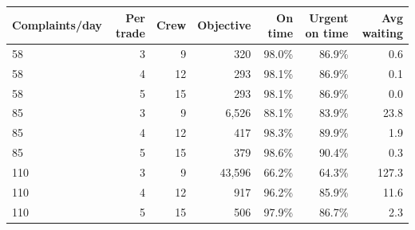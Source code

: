 \begin{tabular}{lrrrrrr}
\toprule
\textbf{Complaints/day} & \textbf{Per trade} & \textbf{Crew} & \textbf{Objective} & \textbf{On time} & \textbf{Urgent on time} & \textbf{Avg waiting} \\
\midrule
58 & 3 & 9 & 320 & 98.0\% & 86.9\% & 0.6 \\
58 & 4 & 12 & 293 & 98.1\% & 86.9\% & 0.1 \\
58 & 5 & 15 & 293 & 98.1\% & 86.9\% & 0.0 \\
85 & 3 & 9 & 6,526 & 88.1\% & 83.9\% & 23.8 \\
85 & 4 & 12 & 417 & 98.3\% & 89.9\% & 1.9 \\
85 & 5 & 15 & 379 & 98.6\% & 90.4\% & 0.3 \\
110 & 3 & 9 & 43,596 & 66.2\% & 64.3\% & 127.3 \\
110 & 4 & 12 & 917 & 96.2\% & 85.9\% & 11.6 \\
110 & 5 & 15 & 506 & 97.9\% & 86.7\% & 2.3 \\
\bottomrule
\end{tabular}
